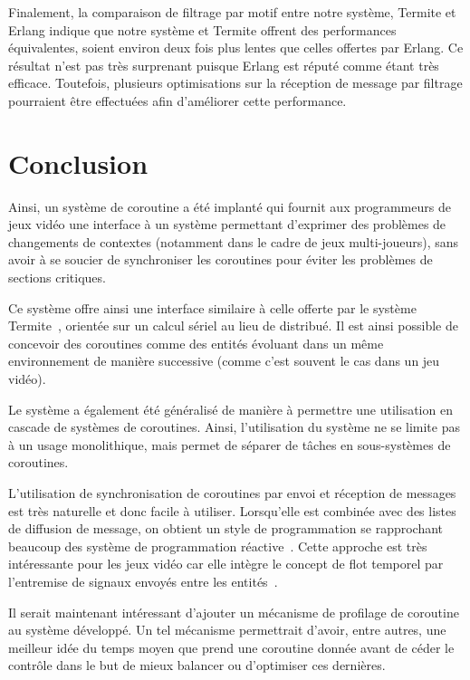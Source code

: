 \documentclass[12pt,twoside,letterpaper,francais]{book}
\begin{document}
Finalement, la comparaison de filtrage par motif entre notre système,
Termite et Erlang indique que notre système et Termite offrent des
performances équivalentes, soient environ deux fois plus lentes que
celles offertes par Erlang. Ce résultat n'est pas très surprenant
puisque Erlang est réputé comme étant très efficace. Toutefois,
plusieurs optimisations sur la réception de message par filtrage
pourraient être effectuées afin d'améliorer cette performance.


\FloatBarrier
\section{Conclusion}
Ainsi, un système de coroutine a été implanté qui fournit aux
programmeurs de jeux vidéo une interface à un système permettant
d'exprimer des problèmes de changements de contextes (notamment dans
le cadre de jeux multi-joueurs), sans avoir à se soucier de
synchroniser les coroutines pour éviter les problèmes de sections
critiques.

Ce système offre ainsi une interface similaire à celle offerte par le
système Termite~\cite{Termite_paper}, orientée sur un calcul sériel au
lieu de distribué. Il est ainsi possible de concevoir des coroutines
comme des entités évoluant dans un même environnement de manière
successive (comme c'est souvent le cas dans un jeu vidéo).

Le système a également été généralisé de manière à permettre une
utilisation en cascade de systèmes de coroutines. Ainsi, l'utilisation
du système ne se limite pas à un usage monolithique, mais permet de
séparer de tâches en sous-systèmes de coroutines.

L'utilisation de synchronisation de coroutines par envoi et réception
de messages est très naturelle et donc facile à utiliser. Lorsqu'elle
est combinée avec des listes de diffusion de message, on obtient un
style de programmation se rapprochant beaucoup des système de
programmation réactive~\cite{FRP}. Cette approche est très
intéressante pour les jeux vidéo car elle intègre le concept de flot
temporel par l'entremise de signaux envoyés entre les
entités~\cite{yampa}.

Il serait maintenant intéressant d'ajouter un mécanisme de profilage
de coroutine au système développé. Un tel mécanisme permettrait
d'avoir, entre autres, une meilleur idée du temps moyen que prend une
coroutine donnée avant de céder le contrôle dans le but de mieux
balancer ou d'optimiser ces dernières.
\end{document}
